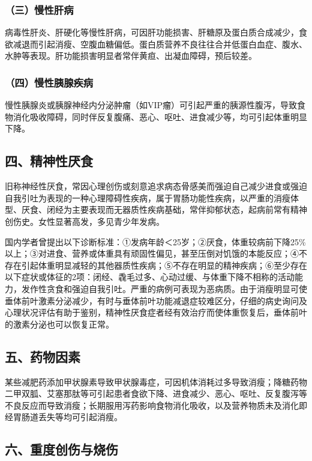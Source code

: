 \subsubsection{（三）慢性肝病}

病毒性肝炎、肝硬化等慢性肝病，可因肝功能损害、肝糖原及蛋白质合成减少，食欲减退而引起消瘦、空腹血糖偏低。蛋白质营养不良往往合并低蛋白血症、腹水、水肿等表现。肝功能损害明显者常伴黄疸、出凝血障碍，预后较差。

\subsubsection{（四）慢性胰腺疾病}

慢性胰腺炎或胰腺神经内分泌肿瘤（如VIP瘤）可引起严重的胰源性腹泻，导致食物消化吸收障碍，同时伴反复腹痛、恶心、呕吐、进食减少等，均可引起体重明显下降。

\subsection{四、精神性厌食}

旧称神经性厌食，常因心理创伤或刻意追求病态骨感美而强迫自己减少进食或强迫自我引吐为表现的一种心理障碍性疾病，属于胃肠功能性疾病，以严重的消瘦体型、厌食、闭经为主要表现而无器质性疾病基础，常伴抑郁状态，起病前常有精神创伤史。女性显著高发，多见青少年发病。

国内学者曾提出以下诊断标准：①发病年龄＜25岁；②厌食，体重较病前下降25\%以上；③对进食、营养或体重具有顽固性偏见，甚至压倒对饥饿的本能反应；④不存在引起体重明显减轻的其他器质性疾病；⑤不存在明显的精神疾病；⑥至少存在以下症状或体征的2项：闭经、毳毛过多、心动过缓、与体重下降不相称的活动能力，发作性贪食和强迫自我引吐。严重的病例可表现为恶病质。由于消瘦明显可使垂体前叶激素分泌减少，有时与垂体前叶功能减退症较难区分，仔细的病史询问及心理状况评估有助于鉴别，精神性厌食症者经有效治疗而使体重恢复后，垂体前叶的激素分泌也可以恢复正常。

\subsection{五、药物因素}

某些减肥药添加甲状腺素导致甲状腺毒症，可因机体消耗过多导致消瘦；降糖药物二甲双胍、艾塞那肽等可引起患者食欲下降、进食减少、恶心、呕吐、反复腹泻等不良反应而导致消瘦；长期服用泻药影响食物消化吸收，以及营养物质未及消化即经胃肠道丢失等均可引起消瘦。

\subsection{六、重度创伤与烧伤}


